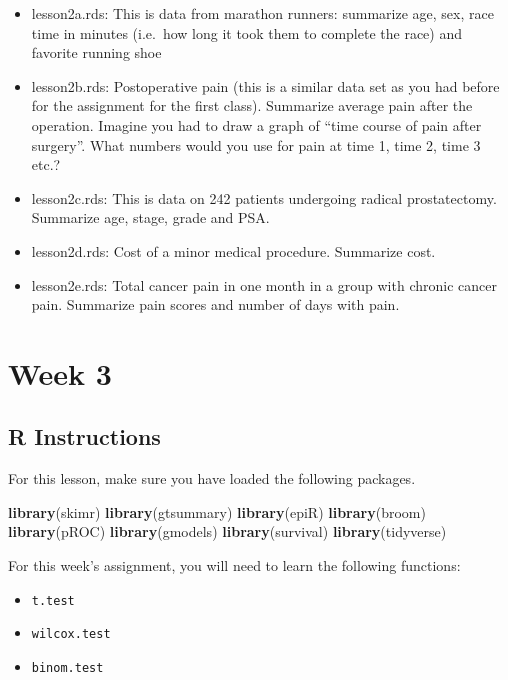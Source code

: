 \documentclass[]{book}
\newenvironment{Shaded}{\begin{snugshade}}{\end{snugshade}}
\newcommand{\KeywordTok}[1]{\textcolor[rgb]{0.13,0.29,0.53}{\textbf{#1}}}
\newcommand{\NormalTok}[1]{#1}
\providecommand{\tightlist}{%
  \setlength{\itemsep}{0pt}\setlength{\parskip}{0pt}}
\begin{document}
\begin{itemize}
\tightlist
\item
  lesson2a.rds: This is data from marathon runners: summarize age, sex, race time in minutes (i.e.~how long it took them to complete the race) and favorite running shoe
\item
  lesson2b.rds: Postoperative pain (this is a similar data set as you had before for the assignment for the first class). Summarize average pain after the operation. Imagine you had to draw a graph of ``time course of pain after surgery''. What numbers would you use for pain at time 1, time 2, time 3 etc.?
\item
  lesson2c.rds: This is data on 242 patients undergoing radical prostatectomy. Summarize age, stage, grade and PSA.
\item
  lesson2d.rds: Cost of a minor medical procedure. Summarize cost.
\item
  lesson2e.rds: Total cancer pain in one month in a group with chronic cancer pain. Summarize pain scores and number of days with pain.
\end{itemize}

\hypertarget{week-3}{%
\chapter{Week 3}\label{week-3}}

\hypertarget{r-instructions-2}{%
\section{R Instructions}\label{r-instructions-2}}

For this lesson, make sure you have loaded the following packages.

\begin{Shaded}
\begin{Highlighting}[]
\KeywordTok{library}\NormalTok{(skimr)}
\KeywordTok{library}\NormalTok{(gtsummary)}
\KeywordTok{library}\NormalTok{(epiR)}
\KeywordTok{library}\NormalTok{(broom)}
\KeywordTok{library}\NormalTok{(pROC)}
\KeywordTok{library}\NormalTok{(gmodels)}
\KeywordTok{library}\NormalTok{(survival)}
\KeywordTok{library}\NormalTok{(tidyverse)}
\end{Highlighting}
\end{Shaded}

For this week's assignment, you will need to learn the following functions:

\begin{itemize}
\tightlist
\item
  \texttt{t.test}
\item
  \texttt{wilcox.test}
\item
  \texttt{binom.test}
\end{itemize}
\end{document}
